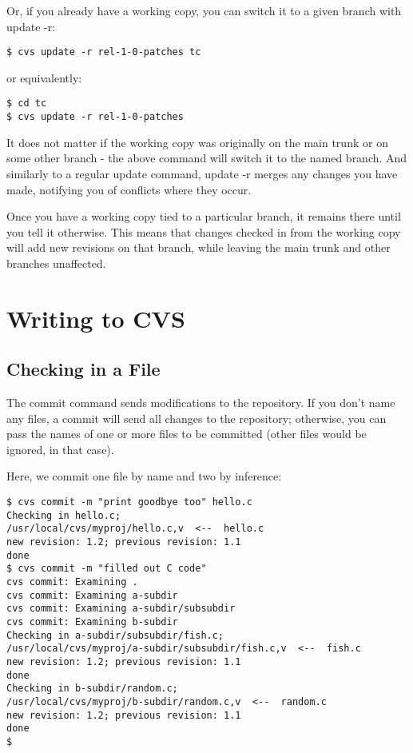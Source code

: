 Or, if you already have a working copy, you can switch it to a given branch with update -r:

\begin{verbatim}
$ cvs update -r rel-1-0-patches tc
\end{verbatim}

or equivalently:

\begin{verbatim}
$ cd tc
$ cvs update -r rel-1-0-patches
\end{verbatim}

It does not matter if the working copy was originally on the main trunk or on some other branch - the above command will switch it to the named branch.  And similarly to a regular update command, update -r merges any changes you have made, notifying you of conflicts where they occur.

Once you have a working copy tied to a particular branch, it remains there until you tell it otherwise.  This means that changes checked in from the working copy will add new revisions on that branch, while leaving the main trunk and other branches unaffected.



\section{Writing to CVS}

\subsection{Checking in a File}

The commit command sends modifications to the repository. If you don't name any files, a commit will send all changes to the repository; otherwise, you can pass the names of one or more files to be committed (other files would be ignored, in that case). 

Here, we commit one file by name and two by inference: 

\begin{verbatim}
$ cvs commit -m "print goodbye too" hello.c
Checking in hello.c;
/usr/local/cvs/myproj/hello.c,v  <--  hello.c
new revision: 1.2; previous revision: 1.1
done
$ cvs commit -m "filled out C code"
cvs commit: Examining .
cvs commit: Examining a-subdir
cvs commit: Examining a-subdir/subsubdir
cvs commit: Examining b-subdir
Checking in a-subdir/subsubdir/fish.c;
/usr/local/cvs/myproj/a-subdir/subsubdir/fish.c,v  <--  fish.c
new revision: 1.2; previous revision: 1.1
done
Checking in b-subdir/random.c;
/usr/local/cvs/myproj/b-subdir/random.c,v  <--  random.c
new revision: 1.2; previous revision: 1.1
done
$
\end{verbatim}


